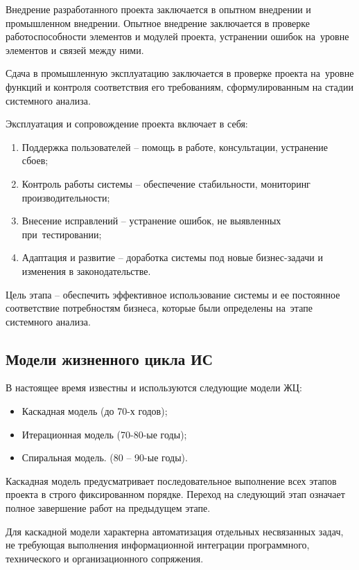 \documentclass{ou}
\begin{document}
Внедрение разработанного проекта заключается в опытном внедрении и промышленном внедрении. Опытное внедрение заключается в проверке работоспособности элементов и модулей проекта, устранении ошибок на~уровне элементов и связей между ними.

Сдача в промышленную эксплуатацию заключается в проверке проекта на~уровне функций и контроля соответствия его требованиям, сформулированным на стадии системного анализа.

Эксплуатация и сопровождение проекта включает в себя:
\begin{enumerate}[leftmargin=0em, itemindent=3.75em, nosep, label=\arabic*)]
\item Поддержка пользователей -- помощь в работе, консультации, устранение сбоев;
\item Контроль работы системы -- обеспечение стабильности, мониторинг производительности;
\item Внесение исправлений -- устранение ошибок, не выявленных при~тестировании;
\item Адаптация и развитие -- доработка системы под новые бизнес-задачи и изменения в законодательстве.
\end{enumerate}

Цель этапа -- обеспечить эффективное использование системы и ее постоянное соответствие потребностям бизнеса, которые были определены на~этапе системного анализа\cite{isis_lifecycle}.
\subsection{Модели жизненного цикла ИС}
В настоящее время известны и используются следующие модели ЖЦ:
\begin{itemize}[label=-, leftmargin=0em, itemindent=3.35em, nosep]
\item Каскадная модель (до 70-х годов);
\item Итерационная модель (70-80-ые годы);
\item Спиральная модель. (80 -- 90-ые годы)\cite{pis_lecture}.
\end{itemize}

Каскадная модель предусматривает последовательное выполнение всех этапов проекта в строго фиксированном порядке. Переход на следующий этап означает полное завершение работ на предыдущем этапе.

Для каскадной модели характерна автоматизация отдельных несвязанных задач, не требующая выполнения информационной интеграции программного, технического и организационного сопряжения.
\end{document}
